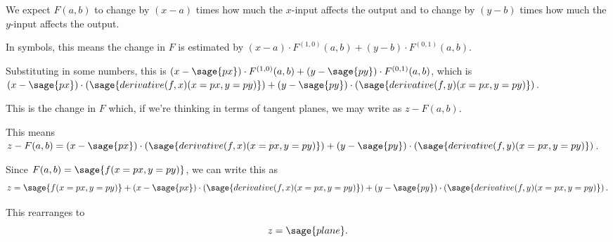 \documentclass{ximera}
\begin{document}
\begin{exercise}
  \begin{hint}
    We expect $F(a,b)$ to change by $(x-a)$ times how much the $x$-input affects the output and to change by $(y-b)$ times how much the $y$-input affects the output.
  \end{hint}

  \begin{hint}
    In symbols, this means the change in $F$ is estimated by $(x-a) \cdot F^{(1,0)}(a,b) + (y-b) \cdot F^{(0,1)}(a,b)$.
  \end{hint}

  \begin{hint}
    Substituting in some numbers, this is
    $(x-\sage{px}) \cdot F^{(1,0)}(a,b) + (y-\sage{py}) \cdot F^{(0,1)}(a,b)$, which is
    $\left(x-\sage{px}\right) \cdot \left( \sage{derivative(f,x)(x=px,y=py)} \right) + \left(y-\sage{py}\right) \cdot \left( \sage{derivative(f,y)(x=px,y=py)} \right)$.
  \end{hint}        

  \begin{hint}
    This is the change in $F$ which, if we're thinking in terms of tangent planes, we may write as $z - F(a,b)$.
  \end{hint}

  \begin{hint}
    This means $z - F(a,b) = \left(x-\sage{px}\right) \cdot \left( \sage{derivative(f,x)(x=px,y=py)} \right) + \left(y-\sage{py}\right) \cdot \left( \sage{derivative(f,y)(x=px,y=py)} \right)$.
  \end{hint}

  \begin{hint}
    Since $F(a,b) = \sage{f(x=px,y=py)}$, we can write this as
    \[
      z =  \sage{f(x=px,y=py)} + \left(x-\sage{px}\right) \cdot \left( \sage{derivative(f,x)(x=px,y=py)} \right) + \left(y-\sage{py}\right) \cdot \left( \sage{derivative(f,y)(x=px,y=py)} \right).
    \]
  \end{hint}

  \begin{hint}
    This rearranges to
    \[
      z = \sage{plane}.
    \]
  \end{hint}
  
\end{exercise}
\end{document}
